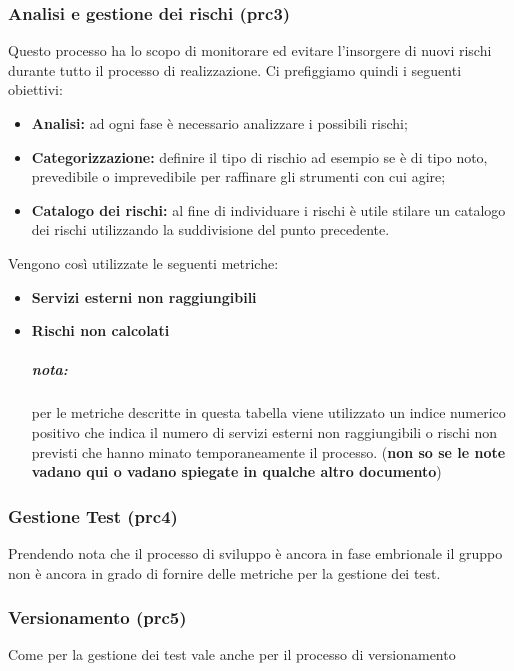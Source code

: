 \subsubsection{Analisi e gestione dei rischi (prc3)}
Questo processo ha lo scopo di monitorare ed evitare l'insorgere di nuovi rischi durante tutto il processo di realizzazione. Ci prefiggiamo quindi i seguenti obiettivi:
\begin{itemize}
	\item{\textbf{Analisi:} ad ogni fase è necessario analizzare i possibili rischi;}
	\item{\textbf{Categorizzazione:}  definire il tipo di rischio ad esempio se è di tipo noto, prevedibile o imprevedibile per raffinare gli strumenti con cui agire;}
	\item{\textbf{Catalogo dei rischi:} al fine di individuare i rischi è utile stilare un catalogo dei rischi utilizzando la suddivisione del punto precedente.}
\end{itemize}
Vengono così utilizzate le seguenti metriche: 
\begin{itemize}
	\item{\textbf{Servizi esterni non raggiungibili}}
	\item{\textbf{Rischi non calcolati}}
	\subparagraph{nota:} per le metriche descritte in questa tabella viene utilizzato un indice numerico positivo che indica il numero di servizi esterni non raggiungibili o rischi non previsti che hanno minato temporaneamente il processo. (\textbf{non so se le note vadano qui o vadano spiegate in qualche altro documento})
\end{itemize}
\begin{table}[!htbp]
	\centering
	\renewcommand{\arraystretch}{2} 
	\caption{TBD}
\end{table}
\newpage
\subsubsection{Gestione Test (prc4)}
Prendendo nota che il processo di sviluppo è ancora in fase embrionale il gruppo non è ancora in grado di fornire delle metriche per la gestione dei test.
\subsubsection{Versionamento (prc5)}
Come per la gestione dei test vale anche per il processo di versionamento
